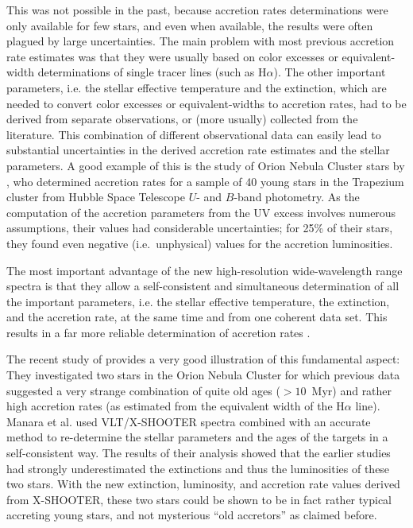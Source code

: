 \documentclass[10pt,fleqn,twoside,a4paper]{article}
\begin{document}
This was not possible in the past, because accretion rates determinations were only
available for few stars, and even when available, the results were often
plagued by large uncertainties.
%
The main problem with most  previous accretion rate estimates was
 that they were usually
based on color excesses or equivalent-width determinations of single tracer lines
(such as H$\alpha$). The other important parameters, i.e. the  stellar effective
temperature and the extinction, which are needed to convert color excesses or
equivalent-widths to accretion rates, had to be derived from separate observations,
or (more usually) collected from the literature.
This combination of different observational data can easily lead to
substantial uncertainties in the derived accretion rate estimates and the stellar parameters.
%
%
A good example of this is the  study of Orion Nebula Cluster stars by \citet{Robberto04},
who determined
accretion rates for a sample of 40
young stars in the Trapezium cluster from Hubble Space Telescope $U$- and $B$-band photometry.
As the computation of the accretion parameters                          
from the UV excess 
involves numerous assumptions, their values had
considerable uncertainties; for 25\% of their
stars, they found even negative (i.e.~unphysical) values for the accretion luminosities.




The most important advantage of the new high-resolution wide-wavelength range
spectra is that they allow a self-consistent and simultaneous
determination of all the important parameters,  i.e. the
stellar effective temperature, the extinction, and the accretion rate, at the same time and
from one coherent data set.
This results in a far more reliable determination of accretion rates \citep[see][]{MT14}.



The recent study of \citet{Manara13} 
provides a very good illustration of this
fundamental aspect: They investigated two stars in the Orion Nebula Cluster
for which previous data suggested a very strange combination 
of quite old ages ($> 10$~Myr)
and rather high accretion rates (as estimated from the equivalent width
of the H$\alpha$ line).
Manara et al. used  VLT/X-SHOOTER spectra combined
 with an accurate method to re-determine the stellar parameters and the ages of the targets in a 
self-consistent way.
The results of their analysis showed that the earlier
studies had strongly underestimated the extinctions and thus the luminosities
of these two stars. With the new extinction, luminosity, and accretion rate
values derived from X-SHOOTER, these two stars could be shown to be in fact
rather typical accreting young  stars, and not mysterious ``old accretors'' as claimed
before.
\end{document}
